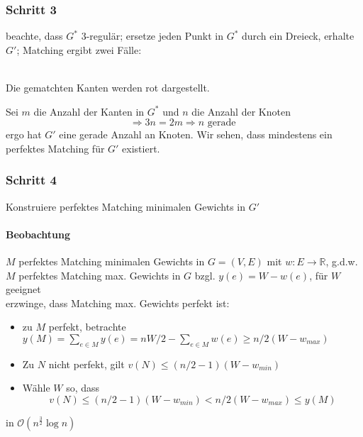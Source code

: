 \documentclass{article}
\renewcommand{\O}[1]{\mathcal{O}\left(#1\right)}
\newcommand{\R}{\mathbb{R}}
\begin{document}
\subsubsection{Schritt 3}
beachte, dass $G^*$ 3-regulär; ersetze jeden Punkt in $G^*$ durch ein Dreieck, erhalte $G'$; Matching ergibt zwei Fälle:
\begin{center}
\\
Die gematchten Kanten werden rot dargestellt.
\end{center}


Sei $m$ die Anzahl der Kanten in $G^*$ und $n$ die Anzahl der Knoten
\[\Rightarrow 3n = 2m \Rightarrow n \text{ gerade }\]
ergo hat $G'$ eine gerade Anzahl an Knoten. Wir sehen, dass mindestens ein perfektes Matching für $G'$ existiert.

\subsubsection{Schritt 4}
Konstruiere perfektes Matching minimalen Gewichts in $G'$
\paragraph{Beobachtung}
$M$ perfektes Matching minimalen Gewichts in $G = (V,E)$ mit $w:E\rightarrow \R$, g.d.w. $M$ perfektes Matching max. Gewichts in $G$ bzgl. $y(e) = W - w(e)$, für $W$ geeignet\\
erzwinge, dass Matching max. Gewichts perfekt ist:
\begin{itemize}
	\item zu $M$ perfekt, betrachte $y(M) = \sum_{e\in M}y(e) = nW/2 - \sum_{e \in M}w(e) \geq n/2 (W- w_{max})$
	\item Zu $N$ nicht perfekt, gilt $v(N) \leq (n/2 - 1)(W - w_{min})$
	\item Wähle $W$ so, dass
	\[v(N) \leq (n/2 - 1)(W - w_{min}) < n/2 (W- w_{max}) \leq y(M)\]
\end{itemize}
in $\O{n^\frac{3}{2}\log n}$
\end{document}
